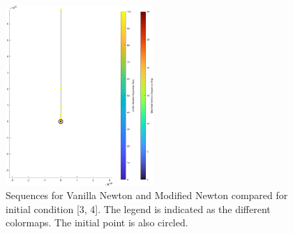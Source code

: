 \begin{figure}[!ht]
    \centering
    \includegraphics[width = 0.5\textwidth]{Images/Fenton_34_total.png}
    \caption{Sequences for Vanilla Newton and Modified Newton compared for initial condition [3, 4]. The legend is indicated as the different colormaps. The initial point is also circled. }
    \label{fig:total42}
\end{figure}

\newpage
